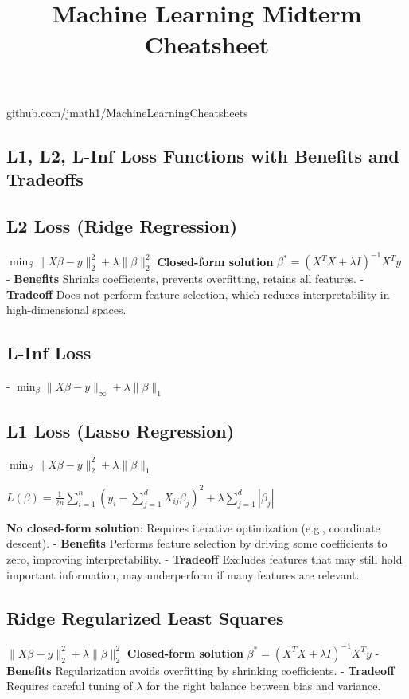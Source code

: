 \documentclass[10pt]{article}
\title{\vspace{-2cm} Machine Learning Midterm Cheatsheet}
\date{}
\begin{document}
\footnotesize

\begin{center}
  github.com/jmath1/MachineLearningCheatsheets
\end{center}
  
\begin{multicols}{2}

\section*{L1, L2, L-Inf Loss Functions with Benefits and Tradeoffs}
\subsection*{L2 Loss (Ridge Regression)}
$\min_{\beta} \|X\beta - y\|_2^2 + \lambda \|\beta\|_2^2$
\textbf{Closed-form solution} $\beta^* = (X^TX + \lambda I)^{-1}X^Ty$
- \textbf{Benefits} Shrinks coefficients, prevents overfitting, retains all features.
- \textbf{Tradeoff} Does not perform feature selection, which reduces interpretability in high-dimensional spaces.
\subsection*{L-Inf Loss}
- $\min_{\beta} \|X\beta - y\|_{\infty} + \lambda \|\beta\|_1$
\subsection*{L1 Loss (Lasso Regression)}
$\min_{\beta} \|X\beta - y\|_2^2 + \lambda \|\beta\|_1$

$L(\beta) = \frac{1}{2n} \sum_{i=1}^{n} \left( y_i - \sum_{j=1}^{d} X_{ij} \beta_j \right)^2 + \lambda \sum_{j=1}^{d} |\beta_j|$

\textbf{No closed-form solution}: Requires iterative optimization (e.g., coordinate descent).
- \textbf{Benefits} Performs feature selection by driving some coefficients to zero, improving interpretability.
- \textbf{Tradeoff} Excludes features that may still hold important information, may underperform if many features are relevant.

\subsection*{Ridge Regularized Least Squares}
$\|X\beta - y\|_2^2 + \lambda\|\beta\|_2^2$
\textbf{Closed-form solution} $\beta^* = (X^TX + \lambda I)^{-1}X^Ty$
- \textbf{Benefits} Regularization avoids overfitting by shrinking coefficients.
- \textbf{Tradeoff} Requires careful tuning of \(\lambda\) for the right balance between bias and variance.


\end{multicols}
\end{document}
